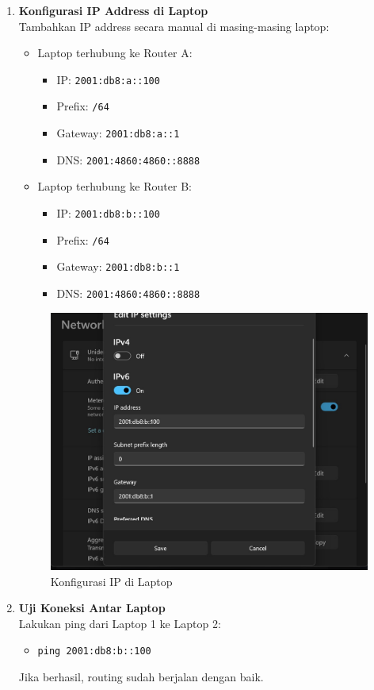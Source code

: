 \begin{enumerate}
    \item \textbf{Konfigurasi IP Address di Laptop} \\
    Tambahkan IP address secara manual di masing-masing laptop:
    \begin{itemize}
        \item Laptop terhubung ke Router A:
        \begin{itemize}
            \item IP: \texttt{2001:db8:a::100}
            \item Prefix: \texttt{/64}
            \item Gateway: \texttt{2001:db8:a::1}
            \item DNS: \texttt{2001:4860:4860::8888}
        \end{itemize}
        \item Laptop terhubung ke Router B:
        \begin{itemize}
            \item IP: \texttt{2001:db8:b::100}
            \item Prefix: \texttt{/64}
            \item Gateway: \texttt{2001:db8:b::1}
            \item DNS: \texttt{2001:4860:4860::8888}
        \end{itemize}
    \end{itemize}

    \begin{figure}[H]
        \centering
        \includegraphics[width=0.5\linewidth]{P2/img/1 (9).jpg}
        \caption{Konfigurasi IP di Laptop}
        \label{fig:gambar7}
    \end{figure}

    \item \textbf{Uji Koneksi Antar Laptop} \\
    Lakukan ping dari Laptop 1 ke Laptop 2:
    \begin{itemize}
        \item \texttt{ping 2001:db8:b::100}
    \end{itemize}
    Jika berhasil, routing sudah berjalan dengan baik.


\end{enumerate}
